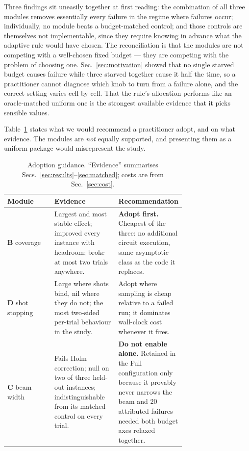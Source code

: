 \documentclass[preprint,11pt]{elsarticle}
\begin{document}
Three findings sit uneasily together at first reading: the combination
of all three modules removes essentially every failure in the regime
where failures occur; individually, no module beats a budget-matched
control; and those controls are themselves not implementable, since they
require knowing in advance what the adaptive rule would have chosen. The
reconciliation is that the modules are not competing with a well-chosen
fixed budget --- they are competing with the problem of choosing one.
Sec.~\ref{sec:motivation} showed that no single starved budget causes
failure while three starved together cause it half the time, so a
practitioner cannot diagnose which knob to turn from a failure alone, and
the correct setting varies cell by cell. That the rule's allocation
performs like an oracle-matched uniform one is the strongest available
evidence that it picks sensible values.

Table~\ref{tab:adopt} states what we would recommend a practitioner
adopt, and on what evidence. The modules are \emph{not} equally
supported, and presenting them as a uniform package would misrepresent
the study.

\begin{table}[htbp]
\centering\small
\caption{Adoption guidance. ``Evidence'' summarises
Secs.~\ref{sec:results}--\ref{sec:matched}; costs are from
Sec.~\ref{sec:cost}.}
\label{tab:adopt}
\begin{tabular}{@{}lp{0.36\linewidth}p{0.36\linewidth}@{}}
\toprule
Module & Evidence & Recommendation \\
\midrule
\textbf{B} coverage
 & Largest and most stable effect; improved every instance with
   headroom; broke at most two trials anywhere.
 & \textbf{Adopt first.} Cheapest of the three: no additional circuit
   execution, same asymptotic class as the code it replaces. \\[3pt]
\textbf{D} shot stopping
 & Large where shots bind, nil where they do not; the most two-sided
   per-trial behaviour in the study.
 & Adopt where sampling is cheap relative to a failed run; it dominates
   wall-clock cost whenever it fires. \\[3pt]
\textbf{C} beam width
 & Fails Holm correction; null on two of three held-out instances;
   indistinguishable from its matched control on every trial.
 & \textbf{Do not enable alone.} Retained in the Full configuration only
   because it provably never narrows the beam and 20 attributed failures
   needed both budget axes relaxed together. \\
\bottomrule
\end{tabular}
\end{table}
\end{document}
